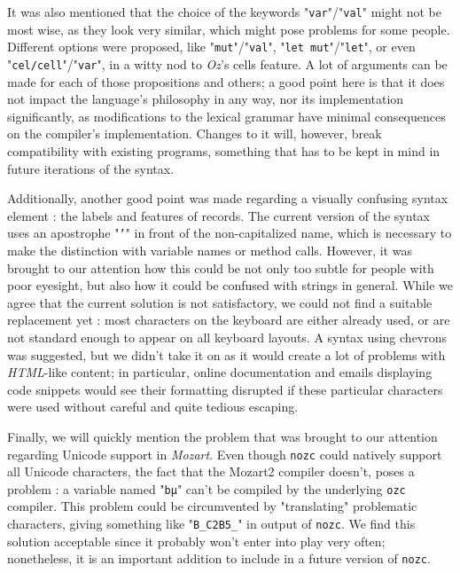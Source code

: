 It was also mentioned that the choice of the keywords "\texttt{var}"/"\texttt{val}" might not be most wise, as they look very similar, which might pose problems for some people.
Different options were proposed, like "\texttt{mut}"/"\texttt{val}", "\texttt{let mut}"/"\texttt{let}", or even "\texttt{cel/cell}"/"\texttt{var}", in a witty nod to \textit{Oz}'s cells feature.
A lot of arguments can be made for each of those propositions and others;
a good point here is that it does not impact the language's philosophy in any way, nor its implementation significantly, as modifications to the lexical grammar have minimal consequences on the compiler's implementation.
Changes to it will, however, break compatibility with existing programs, something that has to be kept in mind in future iterations of the syntax.\newline

Additionally, another good point was made regarding a visually confusing syntax element : the labels and features of records.
The current version of the syntax uses an apostrophe "\texttt{'}" in front of the non-capitalized name, which is necessary to make the distinction with variable names or method calls.
However, it was brought to our attention how this could be not only too subtle for people with poor eyesight, but also how it could be confused with strings in general.
While we agree that the current solution is not satisfactory, we could not find a suitable replacement yet : most characters on the keyboard are either already used, or are not standard enough to appear on all keyboard layouts.
A syntax using chevrons was suggested, but we didn't take it on as it would create a lot of problems with \textit{HTML}-like content;
in particular, online documentation and emails displaying code snippets would see their formatting disrupted if these particular characters were used without careful and quite tedious escaping.\newline

Finally, we will quickly mention the problem that was brought to our attention regarding Unicode support in \textit{Mozart}.
Even though \texttt{nozc} could natively support all Unicode characters, the fact that the Mozart2 compiler doesn't, poses a problem : a variable named "\texttt{bµ}" can't be compiled by the underlying \texttt{ozc} compiler.
This problem could be circumvented by "translating" problematic characters, giving something like "\texttt{B\_C2B5\_}" in output of \texttt{nozc}.
We find this solution acceptable since it probably won't enter into play very often;
nonetheless, it is an important addition to include in a future version of \texttt{nozc}.


